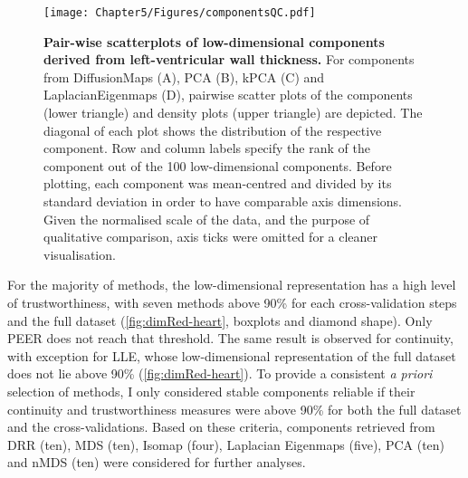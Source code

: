 \begin{figure}[h!]
	\centering
	\texttt{[image: Chapter5/Figures/componentsQC.pdf]}
	\caption[\textbf{Pair-wise scatterplots of low-dimensional components derived from left-ventricular wall thickness. }]{\textbf{Pair-wise scatterplots of low-dimensional components derived from left-ventricular wall thickness. }For components from DiffusionMaps (A), PCA (B), kPCA (C) and LaplacianEigenmaps (D),  pairwise scatter plots of the components (lower triangle) and density plots (upper triangle) are depicted. The diagonal of each plot shows the distribution of the respective component. Row and column labels specify the rank of the component out of the \num{100} low-dimensional components. Before plotting, each component was mean-centred and divided by its standard deviation in order to have comparable axis dimensions. Given the normalised scale of the data, and the purpose of qualitative comparison, axis ticks were omitted for a cleaner visualisation. }
	 	\label{fig:distribution-DimRed}
\end{figure}
%
For the majority of methods, the low-dimensional representation has a high level of trustworthiness, with seven methods above \num{90}\% for each cross-validation steps and the full dataset (\cref{fig:dimRed-heart}, boxplots and diamond shape). Only PEER does not reach that threshold. The same result is observed for continuity, with exception for LLE, whose low-dimensional representation of the full dataset does not lie above \num{90}\% (\cref{fig:dimRed-heart}).  To provide a consistent \textit{a priori} selection of methods, I only considered stable components reliable if their continuity and trustworthiness measures were above \num{90}\% for both the full dataset and the cross-validations. Based on these criteria, components retrieved from DRR (ten), MDS (ten), Isomap (four), Laplacian Eigenmaps (five), PCA (ten) and nMDS (ten) were considered for further analyses.

